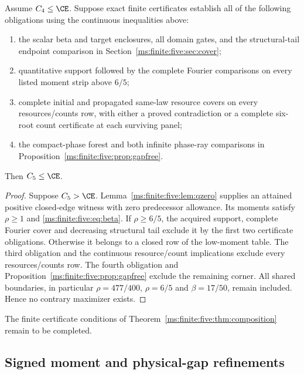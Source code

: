 \begin{theorem}
\label{ms:finite:five:thm:composition}
Assume $C_4\le\CE$. Suppose exact finite certificates establish all
of the following obligations using the continuous inequalities above:
\begin{enumerate}
\item the scalar beta and target enclosures, all domain gates, and the
      structural-tail endpoint comparison in Section~\ref{ms:finite:five:sec:cover};
\item quantitative support followed by the complete Fourier comparisons
      on every listed moment strip above $6/5$;
\item complete initial and propagated same-law resource covers on every
      resources/counts row, with either a proved contradiction or a
      complete six-root count certificate at each surviving panel;
\item the compact-phase forest and both infinite phase-ray comparisons
      in Proposition~\ref{ms:finite:five:prop:gapfree}.
\end{enumerate}
Then $C_5\le\CE$.
\end{theorem}
\begin{proof}
Suppose $C_5>\CE$. Lemma~\ref{ms:finite:five:lem:qzero} supplies an attained
positive closed-edge witness with zero predecessor allowance. Its
moments satisfy $\rho\ge1$ and \eqref{ms:finite:five:eq:beta}.
If $\rho\ge6/5$, the acquired support, complete Fourier cover and
decreasing structural tail exclude it by the first two certificate
obligations. Otherwise it belongs to a closed row of the low-moment
table. The third obligation and the continuous resource/count
implications exclude every resources/counts row. The fourth obligation
and Proposition~\ref{ms:finite:five:prop:gapfree} exclude the remaining corner.
All shared boundaries, in particular $\rho=477/400$, $\rho=6/5$
and $\beta=17/50$, remain included. Hence no contrary maximizer exists.
\end{proof}

The finite certificate conditions of
Theorem~\ref{ms:finite:five:thm:composition} remain to be completed.

\subsection{Signed moment and physical-gap refinements}
\label{ms:finite:signed-refinements}

